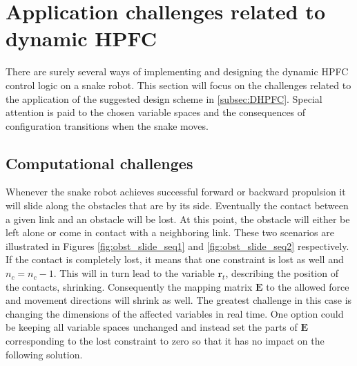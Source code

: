 




\section{Application challenges related to dynamic HPFC}

There are surely several ways of implementing and designing the dynamic HPFC control logic on a snake robot. This section will focus on the challenges related to the application of the suggested design scheme in \ref{subsec:DHPFC}. Special attention is paid to the chosen variable spaces and the consequences of configuration transitions when the snake moves.

\subsection{Computational challenges}

Whenever the snake robot achieves successful forward or backward propulsion it will slide along the obstacles that are by its side. Eventually the contact between a given link and an obstacle will be lost. At this point, the obstacle will either be left alone or come in contact with a neighboring link. These two scenarios are illustrated in Figures \ref{fig:obst_slide_seq1} and \ref{fig:obst_slide_seq2} respectively. If the contact is completely lost, it means that one constraint is lost as well and $n_c = n_c - 1$. This will in turn lead to the variable $\mathbf{r}_t$, describing the position of the contacts, shrinking. Consequently the mapping matrix $\mathbf{E}$ to the allowed force and movement directions will shrink as well. The greatest challenge in this case is changing the dimensions of the affected variables in real time. One option could be keeping all variable spaces unchanged and instead set the parts of $\mathbf{E}$ corresponding to the lost constraint to zero so that it has no impact on the following solution.

